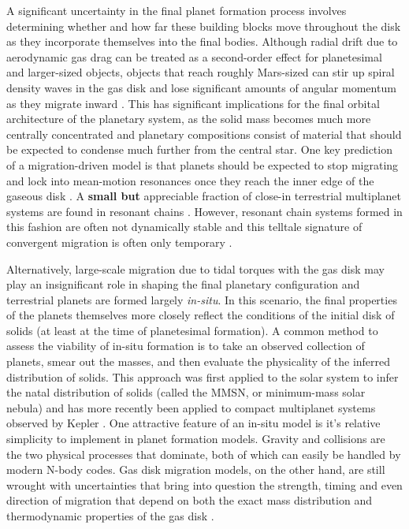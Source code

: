A significant uncertainty in the final planet formation process involves determining whether and how far these building blocks move throughout the disk as they incorporate themselves into the final bodies. Although radial drift due to aerodynamic gas drag can be treated as a second-order effect for planetesimal and larger-sized objects, objects that reach roughly Mars-sized can stir up spiral density waves in the gas disk and lose significant amounts of angular momentum as they migrate inward \cite{ward97}. This has significant implications for the final orbital architecture of the planetary system, as the solid mass becomes much more centrally concentrated and planetary compositions consist of material that should be expected to condense much further from the central star. One key prediction of a migration-driven model is that planets should be expected to stop migrating and lock into mean-motion resonances once they reach the inner edge of the gaseous disk \cite{hands14}. A \textbf{small but} appreciable fraction of close-in terrestrial multiplanet systems are found in resonant chains \cite{gillon16, gillon17, christiansen18, agol21, leleu21}. However, resonant chain systems formed in this fashion are often not dynamically stable and this telltale signature of convergent migration is often only temporary \cite{terquem07, pierens11, izidoro17, mcnally19}.

Alternatively, large-scale migration due to tidal torques with the gas disk may play an insignificant role in shaping the final planetary configuration and terrestrial planets are formed largely \textit{in-situ}. In this scenario, the final properties of the planets themselves more closely reflect the conditions of the initial disk of solids (at least at the time of planetesimal formation). A common method to assess the viability of in-situ formation is to take an observed collection of planets, smear out the masses, and then evaluate the physicality of the inferred distribution of solids. This approach was first applied to the solar system to infer the natal distribution of solids (called the MMSN, or minimum-mass solar nebula) \cite{hayashi81} and has more recently been applied to compact multiplanet systems observed by Kepler \cite{chiang13, dai20}. One attractive feature of an in-situ model is it's relative simplicity to implement in planet formation models. Gravity and collisions are the two physical processes that dominate, both of which can easily be handled by modern N-body codes. Gas disk migration models, on the other hand, are still wrought with uncertainties that bring into question the strength, timing and even direction of migration that depend on both the exact mass distribution and thermodynamic properties of the gas disk \cite{ayliffe10, bitsch13, ogihara18}.

